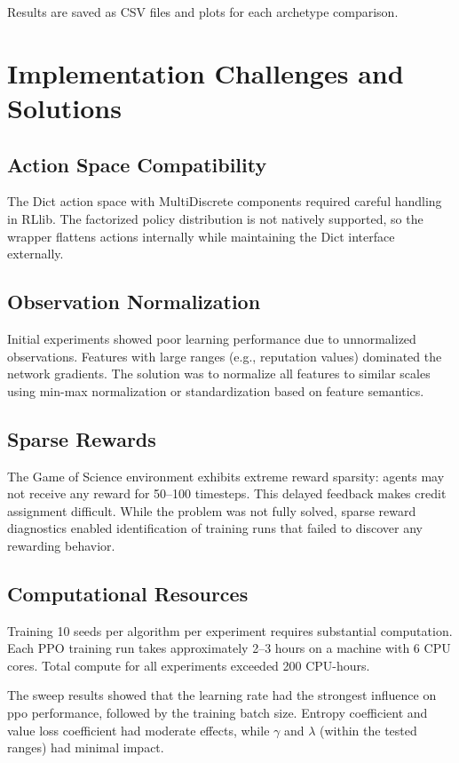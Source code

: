 \documentclass[english,bachelor]{hsluthesis}
\begin{document}
Results are saved as CSV files and plots for each archetype comparison.

\section{Implementation Challenges and Solutions}

\subsection{Action Space Compatibility}

The Dict action space with MultiDiscrete components required careful handling in RLlib. The factorized policy distribution is not natively supported, so the wrapper flattens actions internally while maintaining the Dict interface externally.

\subsection{Observation Normalization}

Initial experiments showed poor learning performance due to unnormalized observations. Features with large ranges (e.g., reputation values) dominated the network gradients. The solution was to normalize all features to similar scales using min-max normalization or standardization based on feature semantics.

\subsection{Sparse Rewards}

The Game of Science environment exhibits extreme reward sparsity: agents may not receive any reward for 50--100 timesteps. This delayed feedback makes credit assignment difficult. While the problem was not fully solved, sparse reward diagnostics enabled identification of training runs that failed to discover any rewarding behavior.

\subsection{Computational Resources}

Training 10 seeds per algorithm per experiment requires substantial computation. Each PPO training run takes approximately 2--3 hours on a machine with 6 CPU cores. Total compute for all experiments exceeded 200 CPU-hours.

The sweep results showed that the learning rate had the strongest influence on \gls{ppo} performance, followed by the training batch size. Entropy coefficient and value loss coefficient had moderate effects, while $\gamma$ and $\lambda$ (within the tested ranges) had minimal impact.
\end{document}
